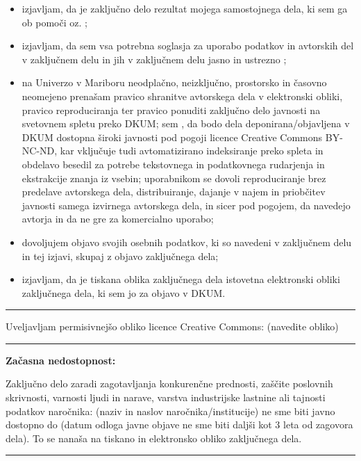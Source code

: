 \pstudentLabelPodpisani{} \pstudentLabel{} \pStudent
\begin{itemize}
    \item izjavljam, da je zaključno delo rezultat mojega samostojnega dela, ki sem ga \pstudentLabelIzdelal{} ob pomoči \pMentorLabelRodilnik{} oz. \pSomentorLabelRodilnik;
    \item izjavljam, da  sem \pstudentLabelPridobil{}  vsa  potrebna  soglasja  za uporabo podatkov in  avtorskih  del v zaključnem delu in jih v zaključnem delu jasno in ustrezno \pstudentLabelOznacil;
    \item na Univerzo v Mariboru neodplačno, neizključno, prostorsko in časovno neomejeno prenašam pravico shranitve avtorskega dela v elektronski obliki, pravico reproduciranja ter pravico ponuditi zaključno delo javnosti na svetovnem spletu  preko  DKUM;  sem \pstudentLabelSeznanjen, da  bodo dela deponirana/objavljena v DKUM dostopna široki javnosti pod pogoji licence Creative Commons BY-NC-ND, kar vključuje tudi avtomatizirano indeksiranje preko spleta in obdelavo besedil za potrebe tekstovnega in podatkovnega rudarjenja in ekstrakcije znanja iz vsebin; uporabnikom se dovoli reproduciranje brez predelave avtorskega dela, distribuiranje, dajanje v najem in priobčitev javnosti samega izvirnega avtorskega dela, in sicer pod pogojem, da navedejo avtorja in da ne gre za komercialno uporabo;
    \item dovoljujem objavo svojih osebnih podatkov, ki so navedeni v zaključnem delu in tej izjavi, skupaj z objavo zaključnega dela;
    \item izjavljam, da je tiskana oblika zaključnega dela istovetna elektronski obliki zaključnega dela, ki sem jo \pstudentLabelOddal{} za objavo v DKUM.
\end{itemize}
\bigskip
\hrule
\bigskip
Uveljavljam permisivnejšo obliko licence Creative Commons: \underline{\hspace{2cm}} (navedite obliko)\par
\medskip
\bigskip
\hrule
\bigskip

\textbf{Začasna nedostopnost:}\par

Zaključno delo zaradi zagotavljanja konkurenčne prednosti, zaščite poslovnih skrivnosti, varnosti ljudi in narave, varstva industrijske lastnine ali tajnosti podatkov naročnika: \underline{\hspace{6cm}} (naziv in naslov naročnika/institucije) ne sme biti javno dostopno  do \underline{\hspace{4cm}} (datum odloga javne objave ne sme biti daljši kot 3 leta od zagovora dela). To se nanaša na tiskano in elektronsko obliko zaključnega dela.
\bigskip
\hrule

